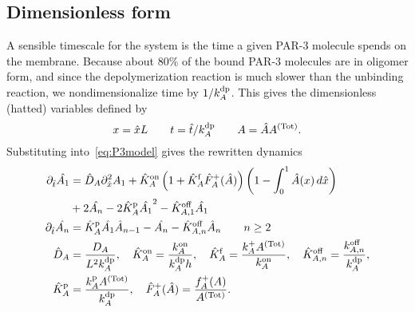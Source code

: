 \documentclass[11pt]{article}
\newcommand{\6}[1]{#1_{\text{6}}}
\newcommand{\3}[1]{#1_{\text{3}}}
\newcommand{\Tot}[1]{#1^\text{(Tot)}}
\newcommand{\A}[1]{#1_A}
\begin{document}
\subsection{Dimensionless form}
A sensible timescale for the system is the time a given PAR-3 molecule spends on the membrane. Because about 80\% of the bound PAR-3 molecules are in oligomer form, and since the depolymerization reaction is much slower than the unbinding reaction, we nondimensionalize time by $1/\A{\kdp}$. This gives the dimensionless (hatted) variables defined by
\begin{equation*}
x = \hat{x} L \qquad t= \hat{t}/\A{\kdp} \qquad A= \hat{A}\Tot{A}.
\end{equation*}
Substituting into\ \eqref{eq:P3model} gives the rewritten dynamics
\begin{subequations}
\label{eq:PAR3gen}
\begin{align}
\nonumber
\Dthat \hat{\MA} & = \DhatA \Dxhat^2 \MA +\KhatonA \left(1+\KhatfA \hat F_A^+(\hat A) \right)\left(1 - \int_0^1 \hat A(x) \, d\hat{x} \right) \\ 
\label{eq:Amono} &+ 2 \hat{\PA}-2\KhatpA \hat{\MA}^2 - \Khatoff_{A,1} \hat{\MA} \\
\label{eq:Apoly}
\Dthat \hat{\PA} & =\KhatpA \hat{\MA} \hat A_{n-1} - \hat{\PA}-\Khatoff_{A,n}\hat A_n \qquad n \geq 2 \\ 
\label{eq:paramsND}
\DhatA &=\frac{\A{D}}{L^2 \A{\kdp}}, \quad \KhatonA=\frac{\A{\kon}}{\A{\kdp} h }, \quad \KhatfA = \frac{\A{\kf}\Tot{A}}{\A{\kon}}, \quad  \Khatoff_{A,n} = \frac{\koff_{A,n}}{\A{\kdp}}, \\ \nonumber \KhatpA &= \frac{\A{\kp} \Tot{A}}{\A{\kdp}},\quad \hat F_A^+(\hat A) =\frac{\A{f}^+(A)}{\Tot{A}}.
\end{align}
\end{subequations}
\end{document}
